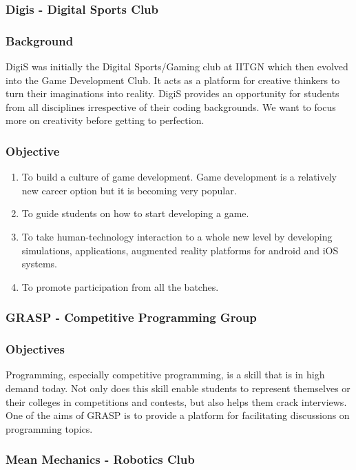 \documentclass[12pt]{article}
\begin{document}
\subsubsection{Digis - Digital Sports Club}
\subsubsection*{Background}
DigiS was initially the Digital Sports/Gaming club at IITGN which then evolved into the Game Development Club. It acts as a platform for creative thinkers to turn their imaginations into reality. DigiS provides an opportunity for students from all disciplines irrespective of their coding backgrounds. We want to focus more on creativity before getting to perfection.

\subsubsection*{Objective}
\begin{enumerate}
    \item To build a culture of game development. Game development is a relatively new career option but it is becoming very popular.
    \item To guide students on how to start developing a game.
    \item To take human-technology interaction to a whole new level by developing simulations, applications, augmented reality platforms for android and iOS systems.
    \item To promote participation from all the batches.
\end{enumerate}

\subsubsection{GRASP - Competitive Programming Group}
\subsubsection*{Objectives}
Programming, especially competitive programming, is a skill that is in high demand today. Not only does this skill enable students to represent themselves or their colleges in competitions and contests, but also helps them crack interviews. One of the aims of GRASP is to provide a platform for facilitating discussions on programming topics.

\subsubsection{Mean Mechanics - Robotics Club}
\end{document}
